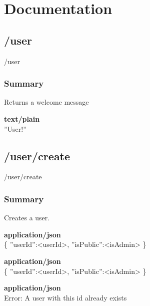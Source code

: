 \documentclass[11pt,fleqn,openany]{book} %
\begin{document}


\chapter{Documentation}

\section{/user}
\begin{get}
/user
\end{get}

\subsection*{Summary}
Returns a welcome message
\begin{parameter}
\end{parameter}
\begin{return}[SUCCESS]
\textbf{text/plain}\\
''User!''
\end{return}

\section{/user/create}
\begin{post}
/user/create
\end{post}

\subsection*{Summary}
Creates a user.
\begin{parameter}
\textbf{application/json}\\
\{ ''userId'':<userId>, ''isPublic'':<isAdmin> \}
\end{parameter}
\begin{return}[CREATED]
\textbf{application/json}\\
\{ ''userId'':<userId>, ''isPublic'':<isAdmin> \}
\end{return}
\begin{return}[CONFLICT]
\textbf{application/json}\\
Error: A user with this id already exists
\end{return}
\end{document}
